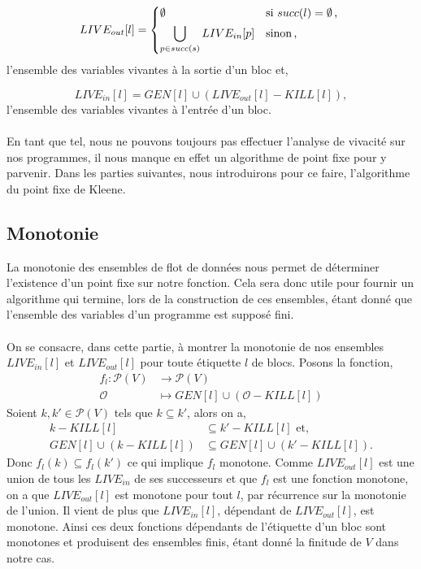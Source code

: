 \documentclass[a4paper, 12pt]{article}
\begin{document}
\[
	LIVE_{out}[l] = 
	\begin{dcases*}
		\emptyset &si $succ(l) = \emptyset $\,, \\
		\bigcup\limits_{p\in succ(s)} LIVE_{in}[p] &sinon\,,
	\end{dcases*}
\]
l'ensemble des variables vivantes à la sortie d'un bloc et,

\[
	LIVE_{in}[l] = GEN[l] \cup (LIVE_{out}[l] - KILL[l]),
\]
l'ensemble des variables vivantes à l'entrée d'un bloc.
\\
\\
En tant que tel, nous ne pouvons toujours pas effectuer l'analyse de vivacité sur nos programmes, il nous manque en
effet un algorithme de point fixe pour y parvenir. Dans les parties suivantes, nous introduirons pour ce faire, 
l'algorithme du point fixe de Kleene.

\subsection{Monotonie}
La monotonie des ensembles de flot de données nous permet de déterminer l'existence d'un point fixe sur notre
fonction. Cela sera donc utile pour fournir un algorithme qui termine, lors de la construction de ces ensembles, 
étant donné que l'ensemble des variables d'un programme est supposé fini.
\\
\\
On se consacre, dans cette partie, à montrer la monotonie de nos ensembles $LIVE_{in}[l]$ et $LIVE_{out}[l]$
pour toute étiquette $l$ de blocs. Posons la fonction,
\begin{align*}
	f_l : \mathcal{P}(V) &\longrightarrow \mathcal{P}(V) \\
	\mathcal{O} &\longmapsto GEN[l] \cup (\mathcal{O} - KILL[l])
\end{align*}
Soient $k, k' \in \mathcal{P}(V)$ tels que $k \subseteq k'$, alors on a,
\begin{align*}
	k - KILL[l] &\subseteq k' - KILL[l] \text{ et,}\\
	GEN[l] \cup (k - KILL[l]) &\subseteq GEN[l] \cup (k' - KILL[l]).
\end{align*}
Donc $f_l(k) \subseteq f_l(k')$ ce qui implique $f_l$ monotone. Comme $LIVE_{out}[l]$ est une union de tous les $LIVE_{in}$
de ses successeurs et que $f_l$ est une fonction monotone, on a que $LIVE_{out}[l]$ est monotone pour tout $l$, par récurrence
sur la monotonie de l'union. Il vient de plus que $LIVE_{in}[l]$, dépendant de $LIVE_{out}[l]$, est monotone.
Ainsi ces deux fonctions dépendants de l'étiquette d'un bloc sont monotones et produisent des ensembles finis, étant donné
la finitude de $V$ dans notre cas.
\end{document}

